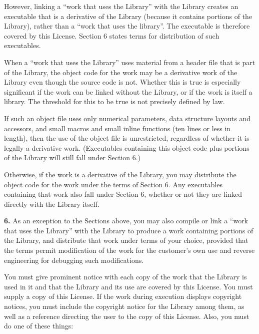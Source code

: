 \documentclass[]{article}
\begin{document}
However, linking a ``work that uses the Library'' with the Library
creates an executable that is a derivative of the Library (because it
contains portions of the Library), rather than a ``work that uses the
library''. The executable is therefore covered by this License. Section
6 states terms for distribution of such executables.

When a ``work that uses the Library'' uses material from a header file
that is part of the Library, the object code for the work may be a
derivative work of the Library even though the source code is not.
Whether this is true is especially significant if the work can be linked
without the Library, or if the work is itself a library. The threshold
for this to be true is not precisely defined by law.

If such an object file uses only numerical parameters, data structure
layouts and accessors, and small macros and small inline functions (ten
lines or less in length), then the use of the object file is
unrestricted, regardless of whether it is legally a derivative work.
(Executables containing this object code plus portions of the Library
will still fall under Section 6.)

Otherwise, if the work is a derivative of the Library, you may
distribute the object code for the work under the terms of Section 6.
Any executables containing that work also fall under Section 6, whether
or not they are linked directly with the Library itself.

\textbf{6.} As an exception to the Sections above, you may also compile
or link a ``work that uses the Library'' with the Library to produce a
work containing portions of the Library, and distribute that work under
terms of your choice, provided that the terms permit modification of the
work for the customer's own use and reverse engineering for debugging
such modifications.

You must give prominent notice with each copy of the work that the
Library is used in it and that the Library and its use are covered by
this License. You must supply a copy of this License. If the work during
execution displays copyright notices, you must include the copyright
notice for the Library among them, as well as a reference directing the
user to the copy of this License. Also, you must do one of these things:
\end{document}
